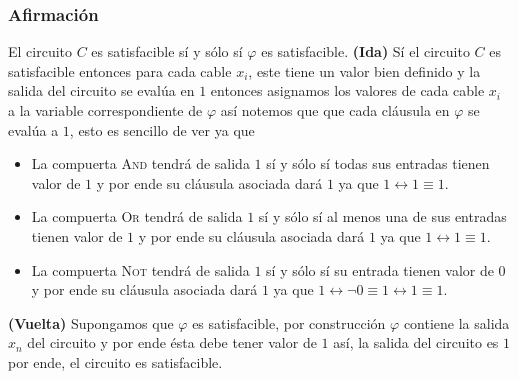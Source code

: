 \documentclass[a4paper]{article}
\begin{document}
\subsubsection{Afirmación}
\noindent
El circuito \(C\) es satisfacible sí y sólo sí \(\varphi\) es satisfacible.
\newline
\textbf{(Ida)}
\newline 
Sí el circuito \(C\) es satisfacible entonces para cada cable \(x_i\), este tiene un valor bien definido y la salida del circuito se evalúa en \(1\)
entonces asignamos los valores de cada cable \(x_{i}\) a la variable correspondiente de \(\varphi\) así notemos que que cada cláusula en \(\varphi\)
se evalúa a \(1\), esto es sencillo de ver ya que
\begin{itemize}
    \item La compuerta \textsc{And} tendrá de salida \(1\) sí y sólo sí todas sus entradas tienen valor de \(1\) y por ende su cláusula asociada dará \(1\) ya que \(1 \longleftrightarrow 1 \equiv 1\).
    \item La compuerta \textsc{Or} tendrá de salida \(1\) sí y sólo sí al menos una de sus entradas tienen valor de \(1\) y por ende su cláusula asociada dará \(1\) ya que \(1 \longleftrightarrow 1 \equiv 1\).
    \item La compuerta \textsc{Not} tendrá de salida \(1\) sí y sólo sí su entrada tienen valor de \(0\) y por ende su cláusula asociada dará \(1\) ya que \(1 \longleftrightarrow \neg 0 \equiv 1 \longleftrightarrow 1 \equiv 1\).
\end{itemize}
\textbf{(Vuelta)}
\newline 
Supongamos que \(\varphi\) es satisfacible, por construcción \(\varphi\) contiene la salida \(x_{n}\) del circuito y por ende ésta debe tener valor de \(1\)
así, la salida del circuito es \(1\) por ende, el circuito es satisfacible.
\end{document}
